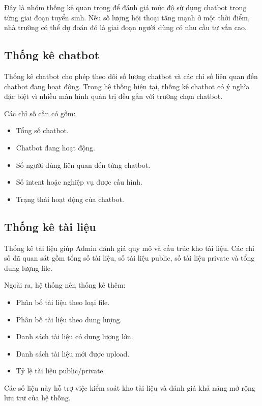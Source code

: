 Đây là nhóm thống kê quan trọng để đánh giá mức độ sử dụng chatbot trong từng giai đoạn tuyển sinh. Nếu số lượng hội thoại tăng mạnh ở một thời điểm, nhà trường có thể dự đoán đó là giai đoạn người dùng có nhu cầu tư vấn cao.

\subsection{Thống kê chatbot}

Thống kê chatbot cho phép theo dõi số lượng chatbot và các chỉ số liên quan đến chatbot đang hoạt động. Trong hệ thống hiện tại, thống kê chatbot có ý nghĩa đặc biệt vì nhiều màn hình quản trị đều gắn với trường chọn chatbot.

Các chỉ số cần có gồm:

\begin{itemize}
    \item Tổng số chatbot.
    \item Chatbot đang hoạt động.
    \item Số người dùng liên quan đến từng chatbot.
    \item Số intent hoặc nghiệp vụ được cấu hình.
    \item Trạng thái hoạt động của chatbot.
\end{itemize}

\subsection{Thống kê tài liệu}

Thống kê tài liệu giúp Admin đánh giá quy mô và cấu trúc kho tài liệu. Các chỉ số đã quan sát gồm tổng số tài liệu, số tài liệu public, số tài liệu private và tổng dung lượng file.

Ngoài ra, hệ thống nên thống kê thêm:

\begin{itemize}
    \item Phân bố tài liệu theo loại file.
    \item Phân bố tài liệu theo dung lượng.
    \item Danh sách tài liệu có dung lượng lớn.
    \item Danh sách tài liệu mới được upload.
    \item Tỷ lệ tài liệu public/private.
\end{itemize}

Các số liệu này hỗ trợ việc kiểm soát kho tài liệu và đánh giá khả năng mở rộng lưu trữ của hệ thống.

